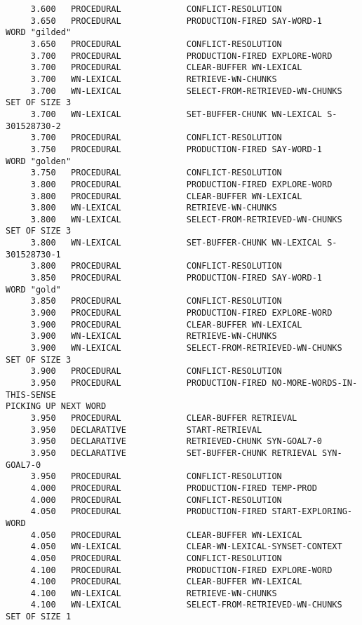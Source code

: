\begin{verbatim}
     3.600   PROCEDURAL             CONFLICT-RESOLUTION 
     3.650   PROCEDURAL             PRODUCTION-FIRED SAY-WORD-1 
WORD "gilded" 
     3.650   PROCEDURAL             CONFLICT-RESOLUTION 
     3.700   PROCEDURAL             PRODUCTION-FIRED EXPLORE-WORD 
     3.700   PROCEDURAL             CLEAR-BUFFER WN-LEXICAL 
     3.700   WN-LEXICAL             RETRIEVE-WN-CHUNKS 
     3.700   WN-LEXICAL             SELECT-FROM-RETRIEVED-WN-CHUNKS SET OF SIZE 3 
     3.700   WN-LEXICAL             SET-BUFFER-CHUNK WN-LEXICAL S-301528730-2 
     3.700   PROCEDURAL             CONFLICT-RESOLUTION 
     3.750   PROCEDURAL             PRODUCTION-FIRED SAY-WORD-1 
WORD "golden" 
     3.750   PROCEDURAL             CONFLICT-RESOLUTION 
     3.800   PROCEDURAL             PRODUCTION-FIRED EXPLORE-WORD 
     3.800   PROCEDURAL             CLEAR-BUFFER WN-LEXICAL 
     3.800   WN-LEXICAL             RETRIEVE-WN-CHUNKS 
     3.800   WN-LEXICAL             SELECT-FROM-RETRIEVED-WN-CHUNKS SET OF SIZE 3 
     3.800   WN-LEXICAL             SET-BUFFER-CHUNK WN-LEXICAL S-301528730-1 
     3.800   PROCEDURAL             CONFLICT-RESOLUTION 
     3.850   PROCEDURAL             PRODUCTION-FIRED SAY-WORD-1 
WORD "gold" 
     3.850   PROCEDURAL             CONFLICT-RESOLUTION 
     3.900   PROCEDURAL             PRODUCTION-FIRED EXPLORE-WORD 
     3.900   PROCEDURAL             CLEAR-BUFFER WN-LEXICAL 
     3.900   WN-LEXICAL             RETRIEVE-WN-CHUNKS 
     3.900   WN-LEXICAL             SELECT-FROM-RETRIEVED-WN-CHUNKS SET OF SIZE 3 
     3.900   PROCEDURAL             CONFLICT-RESOLUTION 
     3.950   PROCEDURAL             PRODUCTION-FIRED NO-MORE-WORDS-IN-THIS-SENSE 
PICKING UP NEXT WORD 
     3.950   PROCEDURAL             CLEAR-BUFFER RETRIEVAL 
     3.950   DECLARATIVE            START-RETRIEVAL 
     3.950   DECLARATIVE            RETRIEVED-CHUNK SYN-GOAL7-0 
     3.950   DECLARATIVE            SET-BUFFER-CHUNK RETRIEVAL SYN-GOAL7-0 
     3.950   PROCEDURAL             CONFLICT-RESOLUTION 
     4.000   PROCEDURAL             PRODUCTION-FIRED TEMP-PROD 
     4.000   PROCEDURAL             CONFLICT-RESOLUTION 
     4.050   PROCEDURAL             PRODUCTION-FIRED START-EXPLORING-WORD 
     4.050   PROCEDURAL             CLEAR-BUFFER WN-LEXICAL 
     4.050   WN-LEXICAL             CLEAR-WN-LEXICAL-SYNSET-CONTEXT 
     4.050   PROCEDURAL             CONFLICT-RESOLUTION 
     4.100   PROCEDURAL             PRODUCTION-FIRED EXPLORE-WORD 
     4.100   PROCEDURAL             CLEAR-BUFFER WN-LEXICAL 
     4.100   WN-LEXICAL             RETRIEVE-WN-CHUNKS 
     4.100   WN-LEXICAL             SELECT-FROM-RETRIEVED-WN-CHUNKS SET OF SIZE 1 

\end{verbatim}

